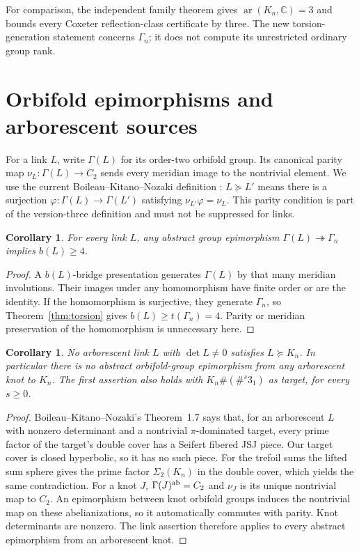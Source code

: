 \documentclass[11pt]{article}
\newtheorem{corollary}[theorem]{Corollary}
\newcommand{\ar}{\operatorname{ar}}
\newcommand{\Sig}{\Sigma_2}
\begin{document}
For comparison, the independent family theorem gives
$\ar(K_n,\mathbb C)=3$ and bounds every Coxeter reflection-class
certificate by three. The new torsion-generation statement concerns
$\Gamma_n$; it does not compute its unrestricted ordinary group rank.

\section{Orbifold epimorphisms and arborescent sources}

For a link $L$, write $\Gamma(L)$ for its order-two orbifold group.
Its canonical parity map $\nu_L:\Gamma(L)\to C_2$ sends every
meridian image to the nontrivial element. We use the current
Boileau--Kitano--Nozaki definition \cite[Definition~1.1]{bkn}:
$L\succeq L'$ means there is a surjection
$\varphi:\Gamma(L)\to\Gamma(L')$ satisfying
$\nu_{L'}\varphi=\nu_L$. This parity condition is part of the
version-three definition and must not be suppressed for links.

\begin{corollary}\label{cor:bridge}
For every link $L$, any abstract group epimorphism
$\Gamma(L)\twoheadrightarrow\Gamma_n$ implies $b(L)\ge4$.
\end{corollary}
\begin{proof}
A $b(L)$-bridge presentation generates $\Gamma(L)$ by that many
meridian involutions. Their images under any homomorphism have
finite order or are the identity. If the homomorphism is surjective,
they generate $\Gamma_n$, so Theorem~\ref{thm:torsion} gives
$b(L)\ge t(\Gamma_n)=4$. Parity or meridian preservation of the
homomorphism is unnecessary here.
\end{proof}

\begin{corollary}\label{cor:arborescent}
No arborescent link $L$ with $\det L\ne0$ satisfies $L\succeq K_n$.
In particular there is no abstract orbifold-group epimorphism from
any arborescent knot to $K_n$. The first assertion also holds with
$K_n\#(\#^s3_1)$ as target, for every $s\ge0$.
\end{corollary}
\begin{proof}
Boileau--Kitano--Nozaki's Theorem~1.7 \cite{bkn} says that, for an
arborescent $L$ with nonzero determinant and a nontrivial
$\pi$-dominated target, every prime factor of the target's double
cover has a Seifert fibered JSJ piece. Our target cover is closed
hyperbolic, so it has no such piece. For the trefoil sums the lifted
sum sphere gives the prime factor $\Sig(K_n)$ in the double cover,
which yields the same contradiction.
For a knot $J$, $\Gamma(J)^{\rm ab}=C_2$ and $\nu_J$ is its unique
nontrivial map to $C_2$. An epimorphism between knot orbifold groups
induces the nontrivial map on these abelianizations, so it automatically
commutes with parity. Knot determinants are nonzero. The link
assertion therefore applies to every abstract epimorphism from an
arborescent knot.
\end{proof}
\end{document}

